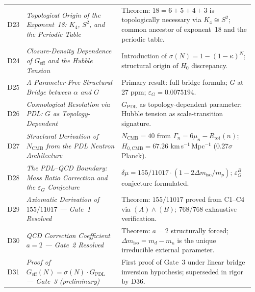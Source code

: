 \documentclass[11pt,a4paper]{article}
\theoremstyle{plain}
\theoremstyle{definition}
\theoremstyle{remark}
\newcommand{\Kfour}{K_4}
\newcommand{\Geff}{G_{\mathrm{eff}}}
\newcommand{\GPDL}{G_{\mathrm{PDL}}}
\newcommand{\epsG}{\varepsilon_G}
\newcommand{\Rtot}{R_{\mathrm{tot}}}
\newcommand{\sigmaN}{\sigma(N)}
\begin{document}
\begin{longtable}{@{}L{1.3cm}L{3.8cm}L{8.0cm}@{}}
D23 & \textit{Topological Origin of the Exponent~18: $\Kfour$, $S^2$, and the Periodic Table}~\citep{D23} & \textcolor{proofblue}{Theorem}: $18=6+5+4+3$ is topologically necessary via $\Kfour\cong S^2$; common ancestor of exponent~18 and the periodic table. \\[0.3em]

D24 & \textit{Closure-Density Dependence of $\Geff$ and the Hubble Tension}~\citep{D24} & Introduction of $\sigmaN=1-(1-\kappa)^N$; structural origin of $H_0$ discrepancy. \\[0.3em]

D25 & \textit{A Parameter-Free Structural Bridge between $\alpha$ and $G$}~\citep{D25} & \textcolor{proofblue}{Primary result}: full bridge formula; $G$ at 27 ppm; $\epsG=0.0075194$. \\[0.3em]

D26 & \textit{Cosmological Resolution via PDL: $G$ as Topology-Dependent}~\citep{D26} & $\GPDL$ as topology-dependent parameter; Hubble tension as scale-transition signature. \\[0.3em]

D27 & \textit{Structural Derivation of $N_{\mathrm{CMB}}$ from the PDL Neutron Architecture}~\citep{D27} & $N_{\mathrm{CMB}}=40$ from $\Gamma_n=6\mu_n-\Rtot(n)$; $H_{0,\mathrm{CMB}}=67.26$ km\,s$^{-1}$\,Mpc$^{-1}$ (0.27$\sigma$ Planck). \\[0.3em]

D28 & \textit{The PDL--QCD Boundary: Mass Ratio Correction and the $\epsG$ Conjecture}~\citep{D28} & $\delta\mu=155/11017\cdot(1-2\Delta m_{\mathrm{iso}}/m_p)$; $\epsG^B$ conjecture formulated. \\[0.3em]

D29 & \textit{Axiomatic Derivation of $155/11017$ — Gate~1 Resolved}~\citep{D29} & \textcolor{proofblue}{Theorem}: $155/11017$ proved from C1--C4 via $(A)\wedge(B)$; 768/768 exhaustive verification. \\[0.3em]

D30 & \textit{QCD Correction Coefficient $a=2$ — Gate~2 Resolved}~\citep{D30} & \textcolor{proofblue}{Theorem}: $a=2$ structurally forced; $\Delta m_{\mathrm{iso}}=m_d-m_u$ is the unique irreducible external parameter. \\[0.3em]

D31 & \textit{Proof of $\Geff(N)=\sigmaN\cdot\GPDL$ — Gate~3 (preliminary)}~\citep{D31} & First proof of Gate~3 under linear bridge inversion hypothesis; superseded in rigor by D36. \\[0.3em]


\end{longtable}
\end{document}
